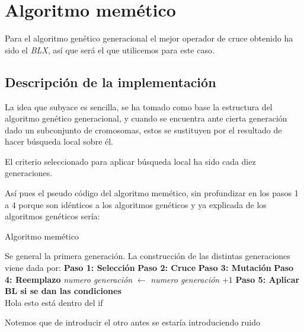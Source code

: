 
\section{Algoritmo memético}  

Para el algoritmo genético generacional el mejor operador de cruce obtenido ha sido el \textit{BLX}, así que será el que utilicemos para este caso. 

\subsection{Descripción de la implementación}  

La idea que subyace es sencilla, se ha tomado como base la estructura del algoritmo genético generacional,
 y cuando se encuentra ante cierta generación dado un subconjunto 
 de cromosomas, estos se sustituyen por el resultado de hacer 
 búsqueda local sobre él. 

El criterio seleccionado para aplicar búsqueda local ha sido cada diez generaciones.

Así pues el pseudo código del algoritmo memético, sin profundizar  en los pasos 1 a 4 porque son idénticos a los algoritmos genéticos y ya explicada de los algoritmos genéticos sería: 

\begin{algorithm}[H]
    \caption{Algoritmo memético}
    \begin{algorithmic}[1]
        \State Se general la primera generación. 
        \State La construcción de las distintas generaciones viene dada por: 
        \State \textbf{Paso 1: Selección}
        \State \textbf{Paso 2: Cruce }
        \State \textbf{Paso 3:  Mutación}
        \State \textbf{Paso 4:  Reemplazo}
        \State \textit{numero generación} $\gets$ \textit{numero generación} $+1$
        \State \textbf{Paso 5: Aplicar BL si se dan las condiciones} \\
            \State Hola esto está dentro del if
        \EndIf 
        \EndWhile
        
    \end{algorithmic}
    
\end{algorithm}

Notemos que de introducir el otro antes se estaría introduciendo 
ruido

